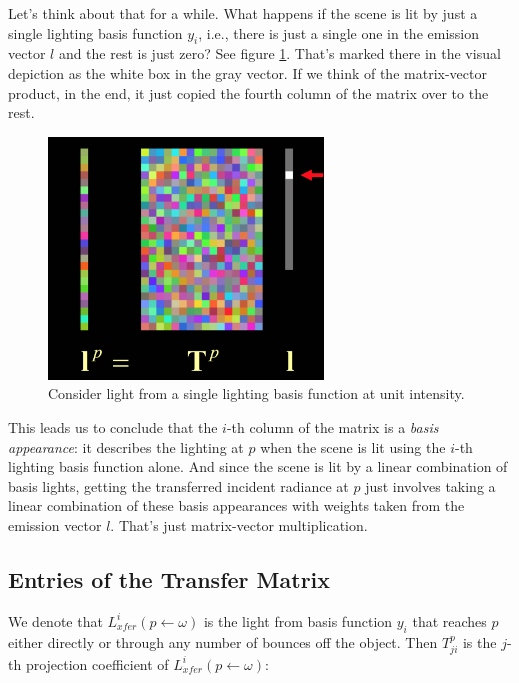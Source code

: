 Let's think about that for a while. What happens if the scene is lit by just a single lighting basis function $y_i$, i.e., there is just a single one in the emission vector $l$ and the rest is just zero? See figure \ref{f:prt-matrix}. That's marked there in the visual depiction as the white box in the gray vector. If we think of the matrix-vector product, in the end, it just copied the fourth column of the matrix over to the rest.

\begin{figure}
\sidecaption
	\includegraphics[width=0.65\textwidth]{graphics/prt/prt-11}
	\caption{Consider light from a single lighting basis function at unit intensity.}
	\label{f:prt-matrix}
\end{figure}

This leads us to conclude that the $i$-th column of the matrix is a \textit{basis appearance}: it describes the lighting at $p$ when the scene is lit using the $i$-th lighting basis function alone. And since the scene is lit by a linear combination of basis lights, getting the transferred incident radiance at $p$ just involves taking a linear combination of these basis appearances with weights taken from the emission vector $l$. That's just matrix-vector multiplication.




\subsection{Entries of the Transfer Matrix}
We denote that $L^{i}_{xfer}(p\leftarrow\omega)$ is the light from basis function $y_i$ that reaches $p$ either directly or through any number of bounces off the object. Then $T^{p}_{ji}$ is the $j$-th projection coefficient of $L^{i}_{xfer}(p\leftarrow\omega)$:

